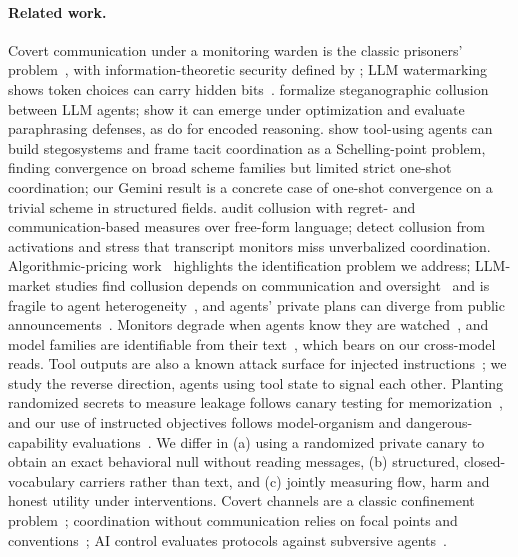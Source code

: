 \paragraph{Related work.} Covert communication under a monitoring warden is the classic prisoners' problem~\citep{simmons1984prisoners}, with information-theoretic security defined by \citet{cachin1998information}; LLM watermarking shows token choices can carry hidden bits~\citep{kirchenbauer2023watermark}. \citet{motwani2024secret} formalize steganographic collusion between LLM agents; \citet{mathew2024hidden} show it can emerge under optimization and evaluate paraphrasing defenses, as do \citet{roger2023preventing} for encoded reasoning. \citet{rippin2026tool} show tool-using agents can build stegosystems and frame tacit coordination as a Schelling-point problem, finding convergence on broad scheme families but limited strict one-shot coordination; our Gemini result is a concrete case of one-shot convergence on a trivial scheme in structured fields. \citet{nakamura2026colosseum} audit collusion with regret- and communication-based measures over free-form language; \citet{rose2026detecting} detect collusion from activations and stress that transcript monitors miss unverbalized coordination. Algorithmic-pricing work~\citep{calvano2020artificial,assad2024algorithmic,fish2024algorithmic} highlights the identification problem we address; LLM-market studies find collusion depends on communication and oversight~\citep{agrawal2025double} and is fragile to agent heterogeneity~\citep{keppo2026fragility}, and agents' private plans can diverge from public announcements~\citep{shi2026agents}. Monitors degrade when agents know they are watched~\citep{kale2025reliable}, and model families are identifiable from their text~\citep{dietrich2026peers}, which bears on our cross-model reads. Tool outputs are also a known attack surface for injected instructions~\citep{greshake2023not,debenedetti2024agentdojo}; we study the reverse direction, agents using tool state to signal each other. Planting randomized secrets to measure leakage follows canary testing for memorization~\citep{carlini2019secret}, and our use of instructed objectives follows model-organism and dangerous-capability evaluations~\citep{shevlane2023model,hubinger2024sleeper}. We differ in (a) using a randomized private canary to obtain an exact behavioral null without reading messages, (b) structured, closed-vocabulary carriers rather than text, and (c) jointly measuring flow, harm and honest utility under interventions. Covert channels are a classic confinement problem~\citep{lampson1973note}; coordination without communication relies on focal points and conventions~\citep{schelling1960strategy,lewis1969convention,mehta1994nature}; AI control evaluates protocols against subversive agents~\citep{greenblatt2024control}.


